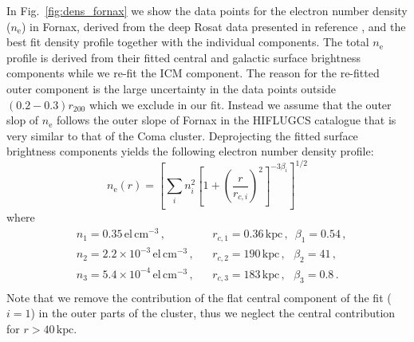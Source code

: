 \documentclass[10pt,aps,pra,reprint,amsmath,amsfonts,amssymb,showpacs,nofootinbib,floatfix]{revtex4-1}
\newcommand{\rmn}{\mathrm}
\newcommand{\kpc}{\rmn{kpc}}
\newcommand{\rvir}{r_{200}}
\newcommand{\e}{\rmn{e}}
\begin{document}
In Fig.~\ref{fig:dens_fornax} we show the data points for the electron
number density ($n_\e$) in Fornax, derived from the deep Rosat data
presented in reference \cite{2002ApJ...565..883P}, and the best fit
density profile together with the individual components. The total
$n_\e$ profile is derived from their fitted central and galactic
surface brightness components while we re-fit the ICM component. The
reason for the re-fitted outer component is the large uncertainty in
the data points outside $(0.2-0.3)\rvir$ which we exclude in our
fit. Instead we assume that the outer slop of $n_\e$ follows the outer
slope of Fornax in the HIFLUGCS catalogue that is very similar to that
of the Coma cluster. Deprojecting the fitted surface brightness
components yields the following electron number density profile:
\begin{equation}
n_\e(r) = \left[\sum_i n_i^2\left[1+\left(\frac{r}{r_{c,i}}\right)^2\right]^{-3\beta_i}\right]^{1/2}
\end{equation}
where
\begin{align}
&n_1 = 0.35\, \rmn{el}\,\rmn{cm}^{-3}\,,
&&r_{c,1} = 0.36\,\kpc\,,\,\,\,
\beta_1 = 0.54\,, \nonumber\\
&n_2 = 2.2\times10^{-3}\,\rmn{el}\,\rmn{cm}^{-3}\,,
&&r_{c,2} = 190\,\kpc\,,\,\,\,\,
\beta_2 = 41\,, \nonumber\\
&n_3 = 5.4\times10^{-4}\,\rmn{el}\,\rmn{cm}^{-3}\,,
&&r_{c,3} = 183\,\kpc\,,\,\,\,\,
\beta_3 = 0.8\,. \nonumber\\
& &&
\label{fit_fornax}
\end{align}
Note that we remove the contribution of the flat central component of
the fit ($i=1$) in the outer parts of the cluster, thus we neglect the
central contribution for $r>40\,\kpc$.
\end{document}
